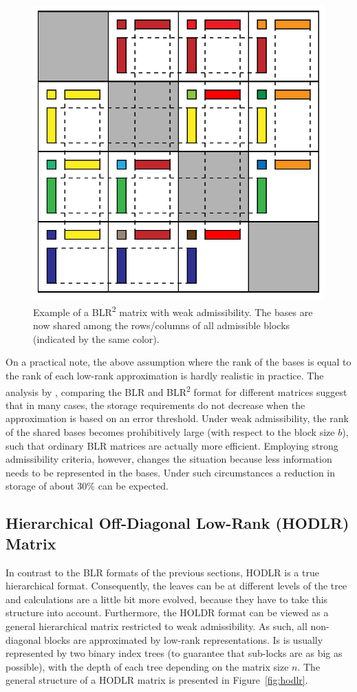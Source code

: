\begin{figure}[h]
    \centering
    \includegraphics[width=0.6\linewidth]{chapters/4_hierarchical_matrices/figures/BLR_shared.pdf}
    \caption[BLR\texorpdfstring{\textsuperscript{2}}{2} Matrix]{Example of a BLR\textsuperscript{2} matrix with weak admissibility. The bases are now shared among the rows/columns of all admissible blocks (indicated by the same color).}
    \label{fig:blr_shared}
\end{figure}

On a practical note, the above assumption where the rank of the bases is equal to the rank of each low-rank approximation is hardly realistic in practice. The analysis by \cite{ashcraft_block_2020}, comparing the BLR and BLR\textsuperscript{2} format for different matrices suggest that in many cases, the storage requirements do not decrease when the approximation is based on an error threshold. Under weak admissibility, the rank of the shared bases becomes prohibitively large (with respect to the block size $b$), such that ordinary BLR matrices are actually more efficient. Employing strong admissibility criteria, however, changes the situation because less information needs to be represented in the bases. Under such circumstances a reduction in storage of about 30\% can be expected.


\subsection{Hierarchical Off-Diagonal Low-Rank (HODLR) Matrix}
\label{sec:hodlr}

In contrast to the BLR formats of the previous sections, HODLR is a true hierarchical format. Consequently, the leaves can be at different levels of the tree and calculations are a little bit more evolved, because they have to take this structure into account. Furthermore, the HOLDR format can be viewed as a general hierarchical matrix restricted to weak admissibility. As such, all non-diagonal blocks are approximated by low-rank representations. Is is usually represented by two binary index trees (to guarantee that sub-locks are as big as possible), with the depth of each tree depending on the matrix size $n$. The general structure of a HODLR matrix is presented in Figure~\hyperref[fig:hodlr]{\ref{fig:hodlr}}.

